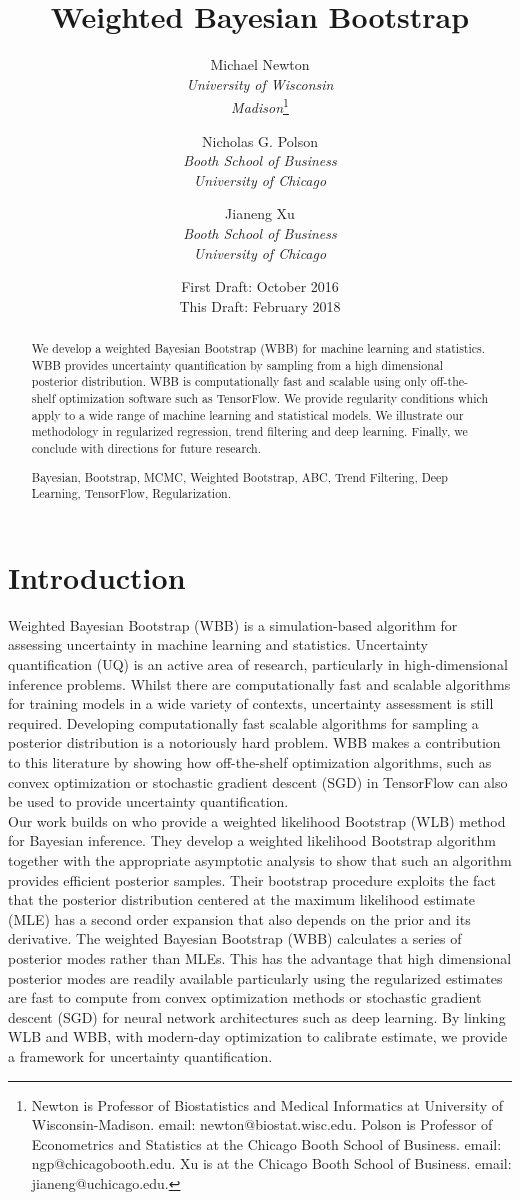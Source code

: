 \documentclass[11pt]{article}%
\title{Weighted Bayesian Bootstrap}
\author{Michael Newton\\
\textit{University of Wisconsin}\\
\textit{Madison}\footnote{Newton is Professor of Biostatistics and Medical Informatics at University of Wisconsin-Madison.  email: newton@biostat.wisc.edu.  Polson is Professor of Econometrics and Statistics
at the Chicago Booth School of Business. email: ngp@chicagobooth.edu. Xu is at the Chicago Booth School of Business. email: jianeng@uchicago.edu.}\\
\and
Nicholas G. Polson\\
\textit{Booth School of Business}\\
\textit{University of Chicago}
\and
Jianeng Xu\\
\textit{Booth School of Business}\\
\textit{University of Chicago}
\\}
\date{First Draft: October 2016\\
This Draft: February 2018}
\begin{document}
\maketitle
\begin{abstract}
\noindent We develop a weighted Bayesian Bootstrap (WBB) for  machine learning and statistics. WBB provides uncertainty quantification by sampling from a high dimensional posterior distribution. WBB is computationally fast and scalable using only off-the-shelf optimization software such as TensorFlow. We provide regularity conditions which apply to a wide range of machine learning and statistical models. We illustrate our methodology in regularized regression, trend filtering and deep learning. Finally, we conclude with directions for future research.
\vspace{0.5pc}

 Bayesian, Bootstrap, MCMC, Weighted Bootstrap, ABC, Trend Filtering, Deep Learning, TensorFlow, Regularization.
\end{abstract}

\newpage

\section{Introduction}
Weighted Bayesian Bootstrap (WBB) is a simulation-based algorithm for assessing uncertainty in machine learning and statistics. Uncertainty quantification (UQ) is an active area of research, particularly in high-dimensional inference problems. Whilst there are computationally fast and scalable algorithms for training models in a wide variety of contexts, uncertainty assessment is still required. Developing computationally fast scalable algorithms for sampling a posterior distribution is a notoriously hard problem. WBB makes a contribution to this literature by showing how off-the-shelf optimization algorithms, such as convex optimization or stochastic gradient descent (SGD) in TensorFlow can also be used to provide uncertainty quantification. 
 \\

\noindent Our work builds on \cite{newton1991approximate} who provide a weighted likelihood Bootstrap (WLB) method for Bayesian inference. They develop a weighted likelihood Bootstrap algorithm together with the appropriate asymptotic analysis to show that such an algorithm 
provides efficient posterior samples. Their bootstrap procedure exploits the fact that the posterior distribution centered at the maximum likelihood estimate (MLE) has a second order expansion that also depends on the prior
and its derivative. The weighted Bayesian Bootstrap (WBB) calculates a series of posterior modes rather than MLEs. This has the advantage that high dimensional posterior modes are readily available particularly using the regularized estimates are fast to compute from convex optimization methods or stochastic gradient descent (SGD) for neural network architectures such as deep learning. By linking WLB and WBB, with modern-day optimization to calibrate estimate, we provide a framework for uncertainty quantification.\\
\end{document}
